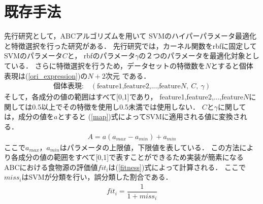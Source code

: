 \section{既存手法}
先行研究として，ABCアルゴリズムを用いて
SVMのハイパーパラメータ最適化と特徴選択を行った研究がある\cite{origin}．
先行研究では，カーネル関数をrbfに固定してSVMのパラメータ$C$と，
rbfのパラメータ$\gamma$の２つのパラメータを最適化対象としている．
さらに特徴選択を行うため，データセットの特徴数を$N$とすると個体表現は(\ref{ori_expression})の$N+2$次元
である．
\begin{align}
  \text{個体表現:} \quad  (\text{feature1,feature2,...,feature}N,~C,~\gamma)\label{ori_expression}
\end{align}
そして，各成分の値の範囲はすべて[0,1]であり，
feature1,feature2,...,feature$N$に関しては0.5以上でその特徴を使用し0.5未満では使用しない．
$C$と$\gamma$に関しては，成分の値を$a$とすると
(\ref{map})式によってSVMに適用される値に変換される．
\begin{align}
  \label{map}
  A =a(a_{max} -a_{min}) + a_{min}
\end{align}
ここで$a_{max}$，$a_{min}$はパラメータの上限値，下限値を表している．
この方法により各成分の値の範囲をすべて[0,1]で表すことができるため実装が簡素になる
ABCにおける食物源の評価値$fit_i$は(\ref{fitness})式によって計算される．
ここで$miss_i$はSVMが分類を行い，誤分類した割合である．
\begin{align}
    \label{fitness}
    fit_i = \dfrac{1}{1+miss_i}
\end{align}